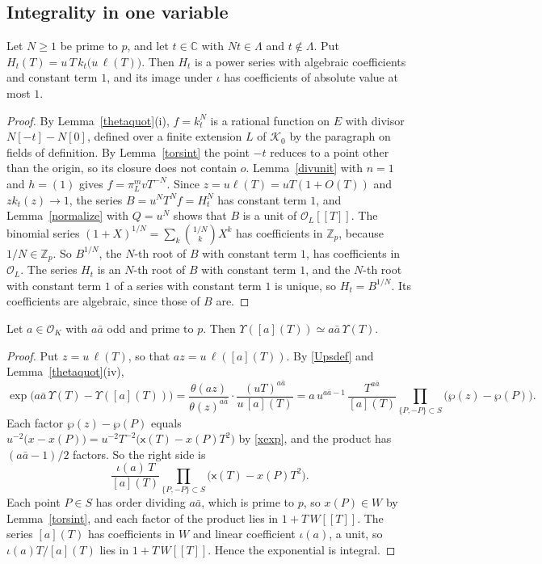 \subsection{Integrality in one variable}\label{sec:onevarint}

\begin{proposition}\label{transl}
Let $N\ge1$ be prime to $p$, and let $t\in\mathbb C$ with $Nt\in\Lambda$ and $t\notin\Lambda$. Put $H_t(T)=u\,T\,k_t\big(u\,\ell(T)\big)$. Then $H_t$ is a power series with algebraic coefficients and constant term $1$, and its image under $\iota$ has coefficients of absolute value at most $1$.
\end{proposition}

\begin{proof}
By Lemma~\ref{thetaquot}(i), $f=k_t^N$ is a rational function on $E$ with divisor $N[-t]-N[0]$, defined over a finite extension $L$ of $\mathcal K_0$ by the paragraph on fields of definition. By Lemma~\ref{torsint} the point $-t$ reduces to a point other than the origin, so its closure does not contain $o$. Lemma~\ref{divunit} with $n=1$ and $h=(1)$ gives $f=\pi_L^mvT^{-N}$. Since $z=u\ell(T)=uT(1+O(T))$ and $zk_t(z)\to1$, the series $B=u^NT^Nf=H_t^N$ has constant term $1$, and Lemma~\ref{normalize} with $Q=u^N$ shows that $B$ is a unit of $\mathcal O_L[[T]]$. The binomial series $(1+X)^{1/N}=\sum_k\binom{1/N}kX^k$ has coefficients in $\mathbb Z_p$, because $1/N\in\mathbb Z_p$. So $B^{1/N}$, the $N$-th root of $B$ with constant term $1$, has coefficients in $\mathcal O_L$. The series $H_t$ is an $N$-th root of $B$ with constant term $1$, and the $N$-th root with constant term $1$ of a series with constant term $1$ is unique, so $H_t=B^{1/N}$. Its coefficients are algebraic, since those of $B$ are.
\end{proof}

\begin{proposition}\label{normrel}
Let $a\in\mathcal O_K$ with $a\bar a$ odd and prime to $p$. Then $\Upsilon([a](T))\simeq a\bar a\,\Upsilon(T)$.
\end{proposition}

\begin{proof}
Put $z=u\,\ell(T)$, so that $az=u\,\ell([a](T))$. By \eqref{Upsdef} and Lemma~\ref{thetaquot}(iv),
\[
\exp\big(a\bar a\,\Upsilon(T)-\Upsilon([a](T))\big)=\frac{\theta(az)}{\theta(z)^{a\bar a}}\cdot\frac{(uT)^{a\bar a}}{u\,[a](T)}=a\,u^{a\bar a-1}\,\frac{T^{a\bar a}}{[a](T)}\prod_{\{P,-P\}\subset S}\big(\wp(z)-\wp(P)\big).
\]
Each factor $\wp(z)-\wp(P)$ equals $u^{-2}\big(x-x(P)\big)=u^{-2}T^{-2}\big(\mathsf x(T)-x(P)T^2\big)$ by \eqref{xexp}, and the product has $(a\bar a-1)/2$ factors. So the right side is
\[
\frac{\iota(a)\,T}{[a](T)}\prod_{\{P,-P\}\subset S}\big(\mathsf x(T)-x(P)T^2\big).
\]
Each point $P\in S$ has order dividing $a\bar a$, which is prime to $p$, so $x(P)\in W$ by Lemma~\ref{torsint}, and each factor of the product lies in $1+T\,W[[T]]$. The series $[a](T)$ has coefficients in $W$ and linear coefficient $\iota(a)$, a unit, so $\iota(a)T/[a](T)$ lies in $1+T\,W[[T]]$. Hence the exponential is integral.
\end{proof}

